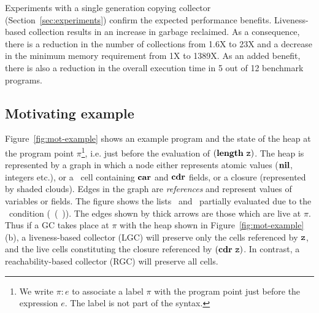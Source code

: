 \documentclass[9pt,preprint,letter,nonatbib]{sigplanconf}
\begin{document}
Experiments    with   a    single    generation   copying    collector
(Section~\ref{sec:experiments})   confirm  the   expected  performance
benefits.  Liveness-based collection results in an increase in garbage
reclaimed.  As  a consequence, there is  a reduction in the  number of
collections from 1.6X  to 23X and a decrease  in the minimum
memory requirement from  1X to 1389X.  As  an added benefit,
there is also a reduction in the overall execution time in 5 out of 12
benchmark programs.
 

\subsection{Motivating example}
\label{sec:motiv}
   Figure~\ref{fig:mot-example}   shows  an   example
program and the state of the heap at the program point $\pi$\footnote{We write
$\pi\!:\!e$ to  associate a  label $\pi$ with  the program  point just
before  the  expression  $e$. The label is not part of the syntax.},  i.e. just  before  the  evaluation  of
$(\mathbf{length}\ \mbox{\tt z})$.  The heap is represented  by a graph in which a node
either  represents  atomic  values   ($\mbox{$\mathbf{ nil}$}$,  integers  etc.),  or  a
\CONS\  cell  containing  $\mbox{$\mathbf{car}$}$  and  $\mbox{$\mathbf{cdr}$}$  fields,  or  a  closure
(represented  by  shaded  clouds).   Edges   in  the  graph  are  {\em
  references} and represent values of variables or fields.  The figure
shows the  lists \px\  and \pz\  partially evaluated  due to  the
\SIF\ condition 
(\NULLQ~(\CAR~\pz)).
The edges  shown by thick  arrows are those  which are live  at $\pi$.
Thus if a GC takes  place at $\pi$ with the heap shown
in Figure~\ref{fig:mot-example}(b),  a liveness-based  collector (LGC)
will preserve only  the cells referenced by $\mbox{\tt z}$, and  the live cells
constituting the  closure referenced by $(\mbox{$\mathbf{cdr}$}~\mbox{\tt z})$.   In contrast, a
reachability-based collector (RGC) will preserve all cells.
\end{document}
